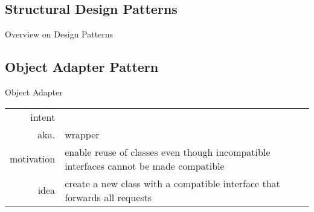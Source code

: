 \subsection{Structural Design Patterns}
\begin{frame}[label=structuralpatterns]{Overview on Design Patterns \mytitlesource{\gof}}
	\centering{}
\end{frame}

\subsection{Object Adapter Pattern}
\begin{frame}{\insertsubsection} %
	\begin{fancycolumns}
		\begin{definition}{Object Adapter \mysource{\gof}}
			\setlength\tabcolsep{1mm}
			\begin{tabularx}{\textwidth}{rX}				
				intent & \mycite{Convert the interface of a class into another interface clients expect. Adapter lets classes work together that couldn't otherwise because of incompatible interfaces.}\\
				aka. & wrapper\\
				motivation & enable reuse of classes even though incompatible interfaces cannot be made compatible\\
				idea & create a new class with a compatible interface that forwards all requests
			\end{tabularx}
		\end{definition}
		\nextcolumn
	\end{fancycolumns}
\end{frame}

